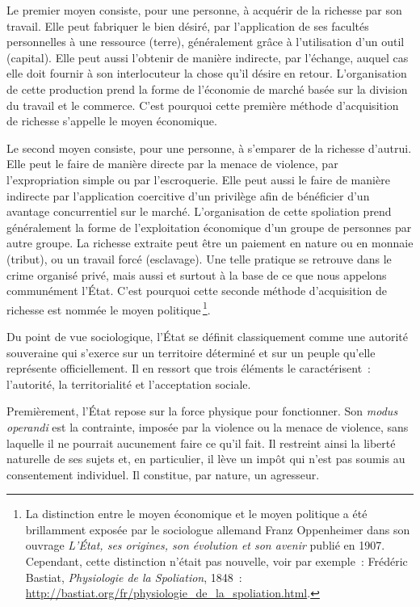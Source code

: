 \documentclass[a4paper,notitlepage]{article}
\newcommand{\sfootnote}{\,\footnote}
\begin{document}
Le premier moyen consiste, pour une personne, à acquérir de la richesse par son travail. Elle peut fabriquer le bien désiré, par l'application de ses facultés personnelles à une ressource (terre), généralement grâce à l'utilisation d'un outil (capital). Elle peut aussi l'obtenir de manière indirecte, par l'échange, auquel cas elle doit fournir à son interlocuteur la chose qu'il désire en retour. L'organisation de cette production prend la forme de l'économie de marché basée sur la division du travail et le commerce. C'est pourquoi cette première méthode d'acquisition de richesse s'appelle le moyen économique.

Le second moyen consiste, pour une personne, à s'emparer de la richesse d'autrui. Elle peut le faire de manière directe par la menace de violence, par l'expropriation simple ou par l'escroquerie. Elle peut aussi le faire de manière indirecte par l'application coercitive d'un privilège afin de bénéficier d'un avantage concurrentiel sur le marché. L'organisation de cette spoliation prend généralement la forme de l'exploitation économique d'un groupe de personnes par autre groupe. La richesse extraite peut être un paiement en nature ou en monnaie (tribut), ou un travail forcé (esclavage). Une telle pratique se retrouve dans le crime organisé privé, mais aussi et surtout à la base de ce que nous appelons communément l'État. C'est pourquoi cette seconde méthode d'acquisition de richesse est nommée le moyen politique\sfootnote{La distinction entre le moyen économique et le moyen politique a été brillamment exposée par le sociologue allemand Franz Oppenheimer dans son ouvrage \emph{L'État, ses origines, son évolution et son avenir} publié en 1907. Cependant, cette distinction n'était pas nouvelle, voir par exemple~: Frédéric Bastiat, \emph{Physiologie de la Spoliation}, 1848~: \url{http://bastiat.org/fr/physiologie_de_la_spoliation.html}.}.

Du point de vue sociologique, l'État se définit classiquement comme une autorité souveraine qui s'exerce sur un territoire déterminé et sur un peuple qu'elle représente officiellement. Il en ressort que trois éléments le caractérisent~: l'autorité, la territorialité et l'acceptation sociale.

Premièrement, l'État repose sur la force physique pour fonctionner. Son \emph{modus operandi} est la contrainte, imposée par la violence ou la menace de violence, sans laquelle il ne pourrait aucunement faire ce qu'il fait. Il restreint ainsi la liberté naturelle de ses sujets et, en particulier, il lève un impôt qui n'est pas soumis au consentement individuel. Il constitue, par nature, un agresseur.
\end{document}
